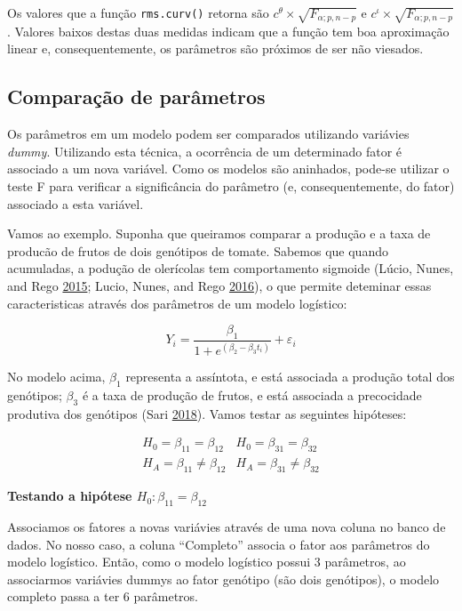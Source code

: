 \documentclass[
]{book}
\numberwithin{equation}{section}
\newcommand{\indt}[1]{\index{#1|ST}}
\begin{document}
Os valores que a função \texttt{rms.curv()} retorna são \({c^\theta } \times \sqrt {{F_{\alpha ;p,n - p}}}\) e \({c^\iota } \times \sqrt {{F_{\alpha ;p,n - p}}}\). Valores baixos destas duas medidas indicam que a função tem boa aproximação linear e, consequentemente, os parâmetros \indt{parâmetros}são próximos de ser não viesados.

\hypertarget{comparauxe7uxe3o-de-paruxe2metros}{%
\subsection{Comparação de parâmetros}\label{comparauxe7uxe3o-de-paruxe2metros}}

Os parâmetros em um modelo podem ser comparados utilizando variávies \emph{dummy}. Utilizando esta técnica, a ocorrência de um determinado fator é associado a um nova variável. Como os modelos são aninhados, pode-se utilizar o teste F para verificar a significância do parâmetro (e, consequentemente, do fator) associado a esta variável.

Vamos ao exemplo. Suponha que queiramos comparar a produção e a taxa de producão de frutos de dois genótipos de tomate. Sabemos que quando acumuladas, a podução de olerícolas tem comportamento sigmoide (Lúcio, Nunes, and Rego \protect\hyperlink{ref-Lucio2015}{2015}; Lucio, Nunes, and Rego \protect\hyperlink{ref-Lucio2016}{2016}), o que permite deteminar essas caracteristicas através dos parâmetros de um modelo logístico:

\[
{Y_i} = \frac{{{\beta _1}}}{{1 + {e^{\left( {{\beta _2} - {\beta _3}{t_i}} \right)}}}} + {\varepsilon _i}
\]

No modelo acima, \(\beta_1\) representa a assíntota, e está associada a produção total dos genótipos; \(\beta_3\) é a taxa de produção de frutos, e está associada a precocidade produtiva dos genótipos (Sari \protect\hyperlink{ref-Sari2018}{2018}). Vamos testar as seguintes hipóteses:

\[
    \begin{array}{*{20}{c}}{{H_0} = {\beta _{11}} = {\beta _{12}}}&{{H_0} = {\beta _{31}} = {\beta _{32}}}\\{{H_A} = {\beta _{11}} \ne {\beta _{12}}}&{{H_A} = {\beta _{31}} \ne {\beta _{32}}}\end{array}
\]

\textbf{Testando a hipótese \(H_0:\beta_{11} = \beta_{12}\)}

Associamos os fatores a novas variávies através de uma nova coluna no banco de dados. No nosso caso, a coluna ``Completo'' associa o fator aos parâmetros \indt{parâmetros}do modelo logístico. Então, como o modelo logístico possui 3 parâmetros, ao associarmos variávies dummys ao fator genótipo (são dois genótipos), o modelo completo passa a ter 6 parâmetros.
\end{document}
